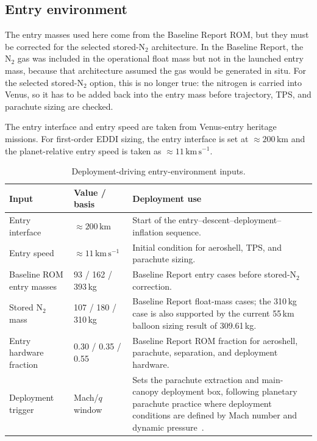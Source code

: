 \subsection{Entry environment}
\label{sec:7-2-1}

The entry masses used here come from the Baseline Report ROM, but they must be corrected for the selected stored-N$_2$ architecture. In the Baseline Report, the N$_2$ gas was included in the operational float mass but not in the launched entry mass, because that architecture assumed the gas would be generated in situ. For the selected stored-N$_2$ option, this is no longer true: the nitrogen is carried into Venus, so it has to be added back into the entry mass before trajectory, TPS, and parachute sizing are checked.

The entry interface and entry speed are taken from Venus-entry heritage missions. For first-order EDDI sizing, the entry interface is set at $\approx 200\,\mathrm{km}$ and the planet-relative entry speed is taken as $\approx 11\,\mathrm{km\,s^{-1}}$.

\begin{table}[H]
\centering
\caption{Deployment-driving entry-environment inputs.}
\label{tab:entry-env}
\small
\renewcommand{\arraystretch}{1.12}
\begin{tabularx}{\textwidth}{@{}p{} p{} X@{}}
\toprule
\textbf{Input} & \textbf{Value / basis} & \textbf{Deployment use} \\
\midrule
Entry interface & $\approx 200\,\mathrm{km}$ & Start of the entry--descent--deployment--inflation sequence. \\
Entry speed & $\approx 11\,\mathrm{km\,s^{-1}}$ & Initial condition for aeroshell, TPS, and parachute sizing. \\
Baseline ROM entry masses & 93 / 162 / 393\,kg & Baseline Report entry cases before stored-N$_2$ correction. \\
Stored N$_2$ mass & 107 / 180 / 310\,kg & Baseline Report float-mass cases; the 310\,kg case is also supported by the current 55\,km balloon sizing result of 309.61\,kg. \\
Entry hardware fraction & 0.30 / 0.35 / 0.55 & Baseline Report ROM fraction for aeroshell, parachute, separation, and deployment hardware. \\
Deployment trigger & Mach/$q$ window & Sets the parachute extraction and main-canopy deployment box, following planetary parachute practice where deployment conditions are defined by Mach number and dynamic pressure~\cite{CruzLingard2006}. \\
\bottomrule
\end{tabularx}
\end{table}

